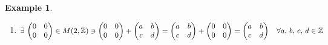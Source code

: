 \documentclass[11pt,a4paper]{article}
\theoremstyle{definition}
\newtheorem{exa}[thm]{Example}
\begin{document}
\begin{exa}
\begin{enumerate}
\begin{enumerate}
      
      \item[(iii)]$\exists\, \begin{pmatrix}
      0 & 0\\
      0 & 0\\
      \end{pmatrix} \in M(2,\mathbb{Z})\ni \begin{pmatrix}
      0 & 0\\
      0 & 0\\
      \end{pmatrix} + \begin{pmatrix}
      a & b\\
      c & d\\
      \end{pmatrix} = \begin{pmatrix}
      a & b\\
      c & d\\
      \end{pmatrix} + \begin{pmatrix}
      0 & 0\\
      0 & 0\\
      \end{pmatrix} = \begin{pmatrix}
      a & b\\
      c & d\\
      \end{pmatrix}\hspace{0.3cm}\forall a,\, b,\, c,\, d\in \mathbb{Z}$\\
      

\end{enumerate}
\end{enumerate}
\end{exa}
\end{document}
